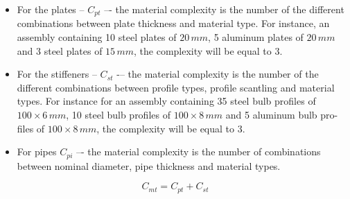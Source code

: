 \begin{itemize}
\item For the plates -- $C_{pt}$ –- the material complexity is the number of the different combinations between plate thickness and material type. For instance, an assembly containing 10 steel plates of $20 \, mm$, 5 aluminum plates of $20 \, mm$ and 3 steel plates of $15 \, mm$, the complexity will be equal to 3.
\item For the stiffeners -- $C_{st}$ -– the material complexity is the number of the different combinations between profile types, profile scantling and material types. For instance for an assembly containing 35 steel bulb profiles of $100 \times 6 \, mm$, 10 steel bulb profiles of $100 \times 8 \, mm$ and 5 aluminum bulb pro-files of $100 \times 8 \, mm$, the complexity will be equal to 3.
\item For pipes $C_{pi}$ –- the material complexity is the number of combinations between nominal diameter, pipe thickness and material types.
\end{itemize}


\begin{equation}
\label{eq_material}
C_{mt} = C_{pt}+C_{st}
\end{equation}


	
